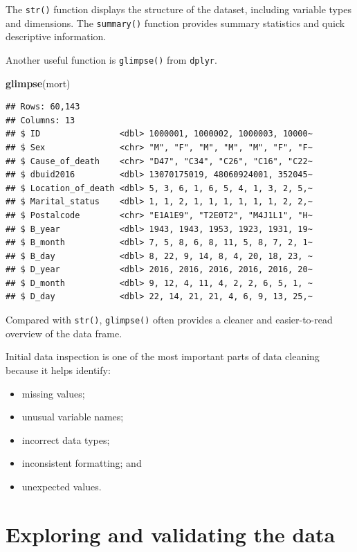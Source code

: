 \documentclass[
  11pt,
  oneside]{book}
\newenvironment{Shaded}{\begin{snugshade}}{\end{snugshade}}
\newcommand{\FunctionTok}[1]{\textcolor[rgb]{0.13,0.29,0.53}{\textbf{#1}}}
\newcommand{\NormalTok}[1]{#1}
\providecommand{\tightlist}{%
  \setlength{\itemsep}{0pt}\setlength{\parskip}{0pt}}
\begin{document}
The \texttt{str()} function displays the structure of the dataset, including variable types and dimensions. The \texttt{summary()} function provides summary statistics and quick descriptive information.

Another useful function is \texttt{glimpse()} from \texttt{dplyr}.

\begin{Shaded}
\begin{Highlighting}[]
\FunctionTok{glimpse}\NormalTok{(mort)}
\end{Highlighting}
\end{Shaded}

\begin{verbatim}
## Rows: 60,143
## Columns: 13
## $ ID                <dbl> 1000001, 1000002, 1000003, 10000~
## $ Sex               <chr> "M", "F", "M", "M", "M", "F", "F~
## $ Cause_of_death    <chr> "D47", "C34", "C26", "C16", "C22~
## $ dbuid2016         <dbl> 13070175019, 48060924001, 352045~
## $ Location_of_death <dbl> 5, 3, 6, 1, 6, 5, 4, 1, 3, 2, 5,~
## $ Marital_status    <dbl> 1, 1, 2, 1, 1, 1, 1, 1, 1, 2, 2,~
## $ Postalcode        <chr> "E1A1E9", "T2E0T2", "M4J1L1", "H~
## $ B_year            <dbl> 1943, 1943, 1953, 1923, 1931, 19~
## $ B_month           <dbl> 7, 5, 8, 6, 8, 11, 5, 8, 7, 2, 1~
## $ B_day             <dbl> 8, 22, 9, 14, 8, 4, 20, 18, 23, ~
## $ D_year            <dbl> 2016, 2016, 2016, 2016, 2016, 20~
## $ D_month           <dbl> 9, 12, 4, 11, 4, 2, 2, 6, 5, 1, ~
## $ D_day             <dbl> 22, 14, 21, 21, 4, 6, 9, 13, 25,~
\end{verbatim}

Compared with \texttt{str()}, \texttt{glimpse()} often provides a cleaner and easier-to-read overview of the data frame.

Initial data inspection is one of the most important parts of data cleaning because it helps identify:

\begin{itemize}
\tightlist
\item
  missing values;
\item
  unusual variable names;
\item
  incorrect data types;
\item
  inconsistent formatting; and
\item
  unexpected values.
\end{itemize}

\section{Exploring and validating the data}\label{exploring-and-validating-the-data}
\end{document}
